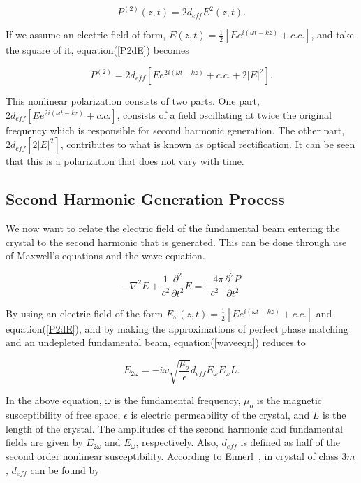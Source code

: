 \begin{equation}\label{P2dE}
P^{(2)}(z,t)=2 d_{eff}E^2(z,t).
\end{equation}

If we assume an electric field of form, $\label{efield} E(z,t) =
\frac{1}{2} \left[ Ee^{i(\omega t-kz)} + c.c.\right]$, and take
the square of it, equation(\ref{P2dE}) becomes

\begin{equation}\label{pol2}
P^{(2)}=2 d_{eff} \left[ Ee^{2i(\omega t-kz)} + c.c. + 2\left| E
\right|^2 \right].
\end{equation}

This nonlinear polarization consists of two parts.  One part, $2
d_{eff} \left[ Ee^{2i(\omega t-kz)} + c.c. \right]$, consists of a
field oscillating at twice the original frequency which is
responsible for second harmonic generation.  The other part, $2
d_{eff} \left[ 2\left| E \right|^2 \right]$, contributes to what
is known as optical rectification.  It can be seen that this is a
polarization that does not vary with time.

\subsection{Second Harmonic Generation Process}
\label{SHG}

We now want to relate the electric field of the fundamental beam
entering the crystal to the second harmonic that is generated.
This can be done through use of Maxwell's equations and the wave
equation.

\begin{equation}\label{waveeqn}
-\nabla^2 E + \frac{1}{c^2} \frac{\partial^2}{\partial t^2} E =
\frac{-4\pi}{c^2} \frac{\partial^2 P}{\partial t^2}
\end{equation}


By using an electric field of the form $\label{efield}
E_{\omega}(z,t) = \frac{1}{2} \left[ Ee^{i(\omega t-kz)} + c.c.
\right]$ and equation(\ref{P2dE}),  and by making the
approximations of perfect phase matching and an undepleted
fundamental beam, equation(\ref{waveeqn}) reduces to~\cite{Yariv}

\begin{equation}\label{shgeqn}
E_{2\omega}= -i \omega \sqrt{\frac{\mu_o}{\epsilon}} d_{eff}
E_{\omega} E_{\omega} L.
\end{equation}

In the above equation, $\omega$ is the fundamental frequency,
$\mu_o$ is the magnetic susceptibility of free space, $\epsilon$
is electric permeability of the crystal, and $L$ is the length of
the crystal. The amplitudes of the second harmonic and fundamental
fields are given by $E_{2\omega}$ and $E_{\omega}$, respectively.
Also, $d_{eff}$ is defined as half of the second order nonlinear
susceptibility. According to Eimerl~\cite{Eimerl}, in crystal of
class 3$m$, $d_{eff}$ can be found by

